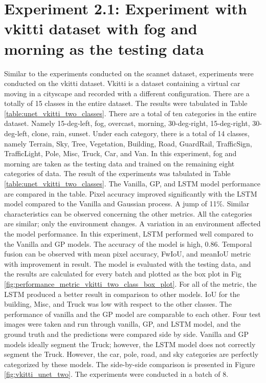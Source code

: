 	\newpage
	\newpage
	
	\section{Experiment 2.1: Experiment with vkitti dataset with fog and morning as the testing data}
	
	Similar to the experiments conducted on the scannet dataset, experiments were conducted on the vkitti dataset. Vkitti is a dataset containing a virtual car moving in a cityscape and recorded with a different configuration. There are a totally of 15 classes in the entire dataset. The results were tabulated in Table \ref{table:unet_vkitti_two_classes}. There are a total of ten categories in the entire dataset. Namely 15-deg-left, fog, overcast, morning, 30-deg-right, 15-deg-right, 30-deg-left, clone, rain, sunset. Under each category, there is a total of 14 classes, namely Terrain, Sky, Tree, Vegetation, Building, Road, GuardRail, TrafficSign, TrafficLight, Pole, Misc, Truck, Car, and Van. In this experiment, fog and morning are taken as the testing data and trained on the remaining eight categories of data.
	The result of the experiments was tabulated in Table \ref{table:unet_vkitti_two_classes}. The Vanilla, GP, and LSTM model performance are compared in the table. Pixel accuracy improved significantly with the LSTM model compared to the Vanilla and Gaussian process. A jump of 11\%. Similar characteristics can be observed concerning the other metrics. All the categories are similar; only the environment changes. A variation in an environment affected the model performance. In this experiment, LSTM performed well compared to the Vanilla and GP models. The accuracy of the model is high, 0.86. Temporal fusion can be observed with mean pixel accuracy, FwIoU, and meanIoU metric with improvement in result. The model is evaluated with the testing data, and the results are calculated for every batch and plotted as the box plot in Fig \ref{fig:performance_metric_vkitti_two_class_box_plot}. For all of the metric, the LSTM produced a better result in comparison to other models. IoU for the building, Misc, and Truck was low with respect to the other classes. The performance of vanilla and the GP model are comparable to each other. Four test images were taken and run through vanilla, GP, and LSTM model, and the ground truth and the predictions were compared side by side. Vanilla and GP models ideally segment the Truck; however, the LSTM model does not correctly segment the Truck. However, the car, pole, road, and sky categories are perfectly categorized by these models. The side-by-side comparison is presented in Figure \ref{fig:vkitti_unet_two}. The experiments were conducted in a batch of 8.
	

